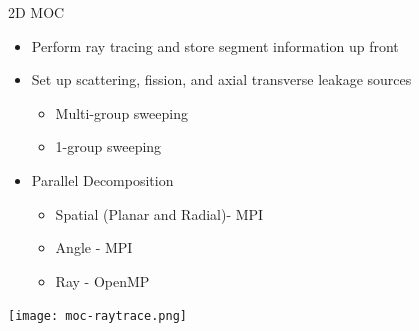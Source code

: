 \begin{frame}[t]{2D MOC}
  
    \vspace{-10pt}
      \begin{itemize}
        \item Perform ray tracing and store segment information up front
        \item Set up scattering, fission, and axial transverse leakage sources
        \begin{itemize}
            \item Multi-group sweeping
          \item 1-group sweeping
        \end{itemize}
        \item Parallel Decomposition
        \begin{itemize}
          \item Spatial (Planar and Radial)- MPI
          \item Angle - MPI
          \item Ray - OpenMP
        \end{itemize}
      \end{itemize}
  \begin{center}
      \texttt{[image: moc-raytrace.png]}
  \end{center}

\end{frame}